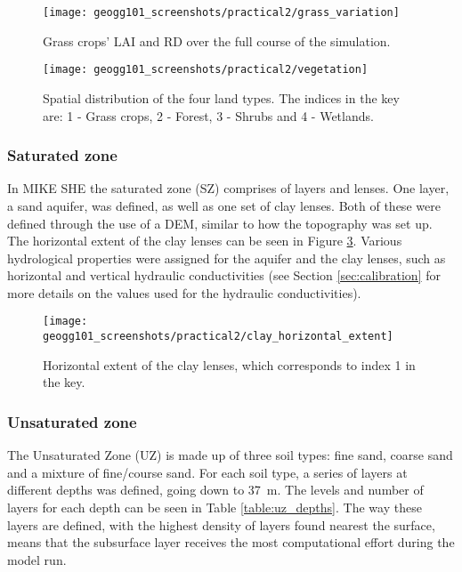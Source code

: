 \documentclass{article}
\begin{document}
\begin{figure}[!h]
    \centering
    \texttt{[image: geogg101\_screenshots/practical2/grass\_variation]}
    \caption{Grass crops' LAI and RD over the full course of the simulation.}
    \label{fig:grass_variation}
\end{figure}

\begin{figure}[!h]
    \centering
    \texttt{[image: geogg101\_screenshots/practical2/vegetation]}
    \caption{Spatial distribution of the four land types. The indices in the key are: 1 - Grass crops, 2 - Forest, 3 - Shrubs and 4 - Wetlands. }
    \label{fig:vegetation}
\end{figure}


\subsubsection{Saturated zone}

In MIKE SHE the saturated zone (SZ) comprises of layers and lenses. One layer, a sand aquifer, was defined, as well as one set of clay lenses. Both of these were defined through the use of a DEM, similar to how the topography was set up. The horizontal extent of the clay lenses can be seen in Figure \ref{fig:clay_horizontal_extent}. Various hydrological properties were assigned for the aquifer and the clay lenses, such as horizontal and vertical hydraulic conductivities (see Section \ref{sec:calibration} for more details on the values used for the hydraulic conductivities).

\begin{figure}[!h]
    \centering
    \texttt{[image: geogg101\_screenshots/practical2/clay\_horizontal\_extent]}
    \caption{Horizontal extent of the clay lenses, which corresponds to index 1 in the key.}
    \label{fig:clay_horizontal_extent}
\end{figure}

\subsubsection{Unsaturated zone}

The Unsaturated Zone (UZ) is made up of three soil types: fine sand, coarse sand and a mixture of fine/course sand. For each soil type, a series of layers at different depths was defined, going down to \SI{37}{m}. The levels and number of layers for each depth can be seen in Table \ref{table:uz_depths}. The way these layers are defined, with the highest density of layers found nearest the surface, means that the subsurface layer receives the most computational effort during the model run.
\end{document}
